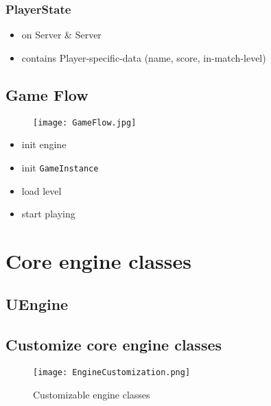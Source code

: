 \documentclass{scrbook}
\newcommand{\code}[1]{\colorbox{mygray}{\lstinline|#1|}}
\begin{document}
            \subsection{PlayerState}
                \begin{itemize}
                    \item on Server \& Server
                    \item contains Player-specific-data (name, score, in-match-level)
                \end{itemize}
        \section{Game Flow}
            \begin{figure}[ht]
                \texttt{[image: GameFlow.jpg]}
                \caption{}
            \end{figure}

            \begin{itemize}
                \item init engine
                \item init \code{GameInstance}
                \item load level
                \item start playing
            \end{itemize}

    \chapter{Core engine classes}

        \section{UEngine}
            

        \section{Customize core engine classes}
            \begin{figure}
                \texttt{[image: EngineCustomization.png]}
                \caption{Customizable engine classes}
                \label{}
            \end{figure}
        
\end{document}
